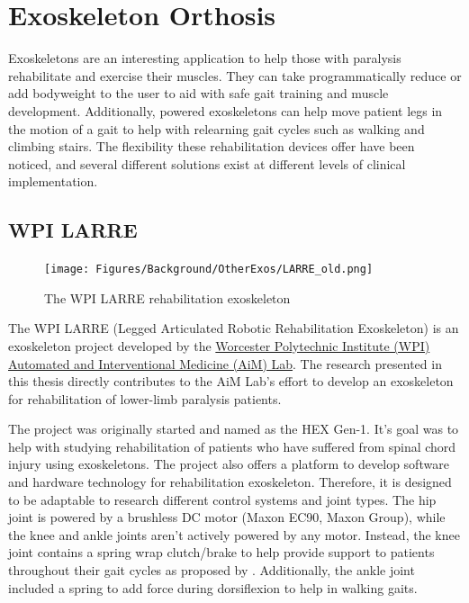 

\section{Exoskeleton Orthosis}
\label{sec:OtherExos}
Exoskeletons are an interesting application to help those with paralysis rehabilitate and exercise their muscles. They can take programmatically reduce or add bodyweight to the user to aid with safe gait training and muscle development. Additionally, powered exoskeletons can help move patient legs in the motion of a gait to help with relearning gait cycles such as walking and climbing stairs. The flexibility these rehabilitation devices offer have been noticed, and several different solutions exist at different levels of clinical implementation.

\subsection{WPI LARRE}
\label{sec:larre}
\begin{figure}[ht!]
    \centering
    \texttt{[image: Figures/Background/OtherExos/LARRE\_old.png]}
    \caption{The WPI LARRE rehabilitation exoskeleton \cite{SpringWrapClutchKnee}}
    \label{fig:LARRE_Background}
\end{figure}

The WPI LARRE (Legged Articulated Robotic Rehabilitation Exoskeleton) is an exoskeleton project developed by the \href{http://aimlabdev.wpi.edu} {Worcester Polytechnic Institute (WPI) Automated and Interventional Medicine (AiM) Lab}. The research presented in this thesis directly contributes to the AiM Lab's effort to develop an exoskeleton for rehabilitation of lower-limb paralysis patients. 

The project was originally started and named as the HEX Gen-1. It's goal was to help with studying rehabilitation of patients who have suffered from spinal chord injury using exoskeletons. The project also offers a platform to develop software and hardware technology for rehabilitation exoskeleton. Therefore, it is designed to be adaptable to research different control systems and joint types. The hip joint is powered by a brushless DC motor (Maxon EC90, Maxon Group), while the knee and ankle joints aren't actively powered by any motor. Instead, the knee joint contains a spring wrap clutch/brake to help provide support to patients throughout their gait cycles as proposed by \cite{SpringWrapClutchKnee}. Additionally, the ankle joint included a spring to add force during dorsiflexion to help in walking gaits.

